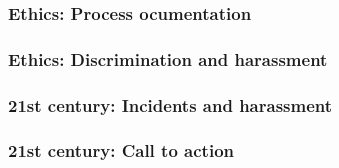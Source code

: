 \begin{frame}[fragile]
\frametitle{Ethics: Process ocumentation}

\end{frame}

\begin{frame}[fragile]
\frametitle{Ethics: Discrimination and harassment}

\end{frame}

\begin{frame}[fragile]
\frametitle{21st century: Incidents and harassment}

\end{frame}

\begin{frame}[fragile]
\frametitle{21st century: Call to action}

\end{frame}



